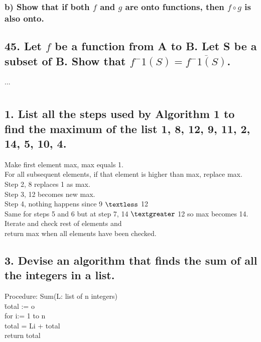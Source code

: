 \documentclass[11pt, oneside]{article} %
\numberwithin{equation}{section} %
\numberwithin{figure}{section} %
\numberwithin{table}{section} %
\begin{document}
\subsubsection{b) Show that if both $f$ and $g$ are onto functions, then $f\circ g$ is also onto.}

\subsection{45. Let $f$ be a function from A to B. Let S be a subset of B. Show that $f^-1(S)=\overline{f^-1(S)}$.}
...

\section{}
\subsection{1. List all the steps used by Algorithm 1 to find the maximum of the list 1, 8, 12, 9, 11, 2, 14, 5, 10, 4.}
Make first element max, max equals 1.\\
For all subsequent elements, if that element is higher than max, replace max.\\
Step 2, 8 replaces 1 as max. \\
Step 3, 12 becomes new max.\\
Step 4, nothing happens since 9 $\textless$ 12\\
Same for steps 5 and 6 but at step 7, 14 $\textgreater$ 12 so max becomes 14.\\
Iterate and check rest of elements and \\
return max when all elements have been checked.


\subsection{3. Devise an algorithm that finds the sum of all the integers in a list.}
\begin{tabbing}
Procedure: Sum(L: list of n integers) \\
\=  total := o \= \= \= \= \= \\
\> for i:= 1 to n\\ 
\> \> total = Li + total \\
\> return total
\end{tabbing}
\end{document}
